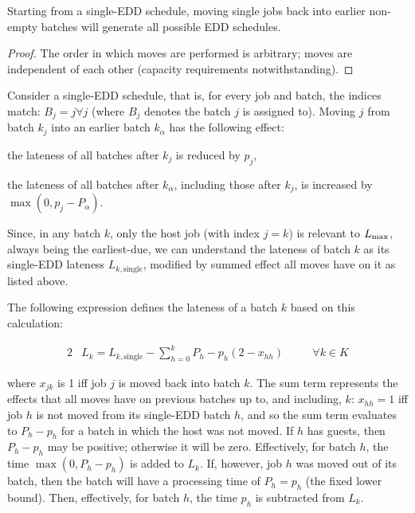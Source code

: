 \documentclass[13pt, letterpaper, oneside]{book}
\begin{document}
\begin{proposition}
Starting from a single-EDD schedule, moving single jobs back into earlier
non-empty batches will generate all possible EDD schedules.
\end{proposition}
\begin{proof}
The order in which moves are performed is arbitrary; moves are independent of
each other (capacity requirements notwithstanding).
\end{proof}
 
Consider a single-EDD schedule, that is, for every job and batch, the indices
match: $B_j = j \forall j$ (where $B_j$ denotes the batch $j$ is assigned to).
Moving $j$ from batch $k_j$ into an earlier batch $k_\alpha$ has the following
effect:
\begin{alist}
\item{the lateness of all batches after $k_j$ is reduced by $p_j$,}
\item{the lateness of all batches after $k_\alpha$, including those after $k_j$, is increased by $\max(0,p_j -
P_\alpha)$.}
\end{alist}
Since, in any batch $k$, only the host job (with index $j = k$) is relevant to
$L_{\text{max}}$, always being the earliest-due, we can understand the lateness of batch $k$ as its single-EDD lateness
$L_{k,\text{single}}$, modified by summed effect all moves have on it as listed
above.
 
The following expression defines the lateness of a batch $k$ based on this
calculation:
 
\begin{alignat}{2}
& L_k = L_{k,\text{single}} - \sum_{h=0}^{k} P_h - p_h(2 - x_{hh}) \quad &&
\forall k \in K
\end{alignat}
 
where $x_{jk}$ is 1 iff job $j$ is moved back into batch $k$. The sum term
represents the effects that all moves have on previous batches up to, and
including, $k$: $x_{hh} = 1$ iff job $h$ is not moved from its single-EDD batch
$h$, and so the sum term evaluates to $P_h - p_h$ for a batch in which the host
was not moved. If $h$ has guests, then $P_h - p_h$ may be positive; otherwise it
will be zero. Effectively, for batch $h$, the time $\max(0, P_h-p_h)$ is added
to $L_k$. If, however, job $h$ was moved out of its batch, then the batch
will have a processing time of $P_h = p_h$ (the fixed lower bound). Then, effectively,
for batch $h$, the time $p_h$ is subtracted from $L_k$.
\end{document}
